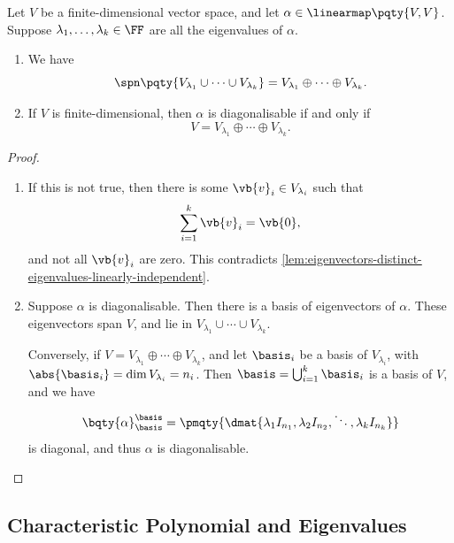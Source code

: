 \begin{proposition}
    \label{prop:eigenspaces-generate-direct-sums}%
    Let \(V\) be a finite-dimensional vector space, and let \(\alpha \in \linearmap\pqty{V, V}\). Suppose \(\lambda_1, \ldots, \lambda_k \in \FF\) are all the eigenvalues of \(\alpha\).

    \begin{enumerate}[label=(\roman*)]
        \item {} We have
        \[
            \spn\pqty{V_{\lambda_1} \cup \cdots \cup V_{\lambda_k}} = V_{\lambda_1} \oplus \cdots \oplus V_{\lambda_k}.
        \]

        \item If \(V\) is finite-dimensional, then \(\alpha\) is diagonalisable if and only if
        \[
            V = V_{\lambda_1} \oplus \cdots \oplus V_{\lambda_k}.
        \]
    \end{enumerate}
\end{proposition}

\begin{proof}
    \begin{enumerate}[label=(\roman*)]
        \item If this is not true, then there is some \(\vb{v}_i \in V_{\lambda_i}\) such that
        \[
            \sum_{i = 1}^{k} \vb{v}_i = \vb{0},
        \]
        and not all \(\vb{v}_i\) are zero. This contradicts \autoref{lem:eigenvectors-distinct-eigenvalues-linearly-independent}.

        \item Suppose \(\alpha\) is diagonalisable. Then there is a basis of eigenvectors of \(\alpha\). These eigenvectors span \(V\), and lie in \(V_{\lambda_1} \cup \cdots \cup V_{\lambda_k}\).
        
        Conversely, if \(V = V_{\lambda_1} \oplus \cdots \oplus V_{\lambda_k}\), and let \(\basis_i\) be a basis of \(V_{\lambda_i}\), with \(\abs{\basis_i} = \dim V_{\lambda_i} = n_i\). Then \(\basis = \bigcup_{i = 1}^{k} \basis_i\) is a basis of \(V\), and we have
        \[
            \bqty{\alpha}_{\basis}^{\basis} = \pmqty{\dmat{\lambda_1 I_{n_1}, \lambda_2 I_{n_2}, \ddots,\lambda_k I_{n_k}}}
        \]
        is diagonal, and thus \(\alpha\) is diagonalisable.
    \end{enumerate}
\end{proof}

\subsection{Characteristic Polynomial and Eigenvalues}

